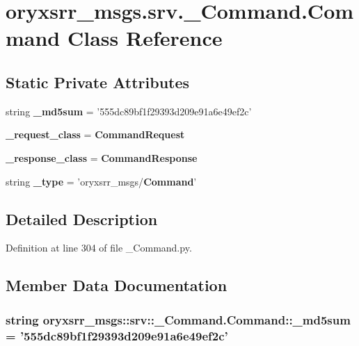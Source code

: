 \section{oryxsrr\-\_\-msgs.\-srv.\-\_\-\-Command.\-Command \-Class \-Reference}
\label{classoryxsrr__msgs_1_1srv_1_1__Command_1_1Command}
\subsection*{\-Static \-Private \-Attributes}
\begin{DoxyCompactItemize}
\item 
string {\bf \-\_\-md5sum} = '555dc89bf1f29393d209e91a6e49ef2c'
\item 
{\bf \-\_\-request\-\_\-class} = {\bf \-Command\-Request}
\item 
{\bf \-\_\-response\-\_\-class} = {\bf \-Command\-Response}
\item 
string {\bf \-\_\-type} = 'oryxsrr\-\_\-msgs/{\bf \-Command}'
\end{DoxyCompactItemize}


\subsection{\-Detailed \-Description}


\-Definition at line 304 of file \-\_\-\-Command.\-py.



\subsection{\-Member \-Data \-Documentation}
\subsubsection[{\-\_\-md5sum}]{\setlength{\rightskip}{0pt plus 5cm}string {\bf oryxsrr\-\_\-msgs\-::srv\-::\-\_\-\-Command.\-Command\-::\-\_\-md5sum} = '555dc89bf1f29393d209e91a6e49ef2c'\hspace{0.3cm}{\ttfamily  [static, private]}}\label{classoryxsrr__msgs_1_1srv_1_1__Command_1_1Command_adbf4850760e76cc78f2c0d2f80c46f73}


